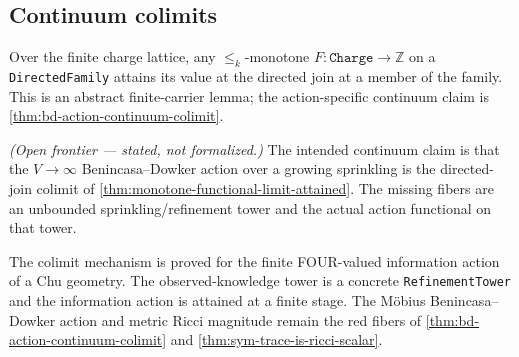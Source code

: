 \subsection{Continuum colimits}

\begin{theorem}\label{thm:monotone-functional-limit-attained}\leanok{}
Over the finite charge lattice, any $\le_k$-monotone
$F:\texttt{Charge}\to\mathbb Z$ on a \texttt{DirectedFamily} attains its value at
the directed join at a member of the family.  This is an abstract finite-carrier
lemma; the action-specific continuum claim is \cref{thm:bd-action-continuum-colimit}.
\end{theorem}

\begin{theorem}\label{thm:bd-action-continuum-colimit}\notready{}
\emph{(Open frontier --- stated, not formalized.)} The intended continuum claim
is that the $V\to\infty$ Benincasa--Dowker action over a growing sprinkling is the
directed-join colimit of \cref{thm:monotone-functional-limit-attained}.  The
missing fibers are an unbounded sprinkling/refinement tower and the actual action
functional on that tower.
\end{theorem}

\begin{theorem}\label{thm:chu-info-action-colimit}\leanok{}
The colimit mechanism is proved for the finite FOUR-valued information action of a
Chu geometry.  The observed-knowledge tower is a concrete \texttt{RefinementTower}
and the information action is attained at a finite stage.  The M\"obius
Benincasa--Dowker action and metric Ricci magnitude remain the red fibers of
\cref{thm:bd-action-continuum-colimit} and \cref{thm:sym-trace-is-ricci-scalar}.
\end{theorem}

